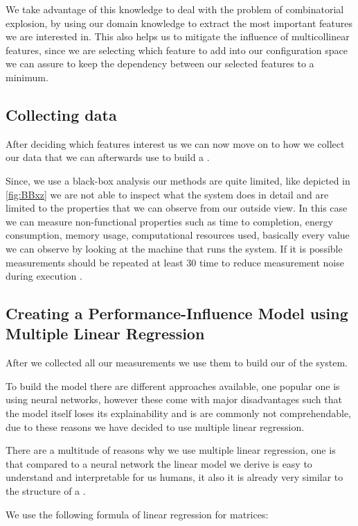 We take advantage of this knowledge to deal with the problem of combinatorial explosion, by using our domain knowledge to extract the most important
features we are interested in. This also helps us to mitigate the influence of multicollinear features, since we are selecting which feature to add
into our configuration space we can assure to keep the dependency between our selected features to a minimum.

\subsection{Collecting data}
After deciding which features interest us we can now move on to how we collect our data that we can afterwards use to build a \perfInfluenceModel.

Since, we use a black-box analysis our methods are quite limited, like depicted in \ref{fig:BBxz} we are not able to inspect what the system does 
in detail and are limited to the properties that we can observe from our outside view. In this case we can measure non-functional properties
such as time to completion, energy consumption, memory usage, computational resources used, basically every value we can observe by looking at the
machine that runs the system. If it is possible measurements should be repeated at least 30 time to reduce measurement noise during execution 
\cite{SampleSize}.


\subsection{Creating a Performance-Influence Model using Multiple Linear Regression}
After we collected all our measurements we use them to build our \perfInfluenceModel of the system. 

To build the model there are different
approaches available, one popular one is using neural networks, however these come with major disadvantages such that the model itself 
loses its explainability and is are commonly not comprehendable, due to these reasons we have decided to use multiple linear regression.

There are a multitude of reasons why we use multiple linear regression, one is that compared to a neural network the linear model we 
derive is easy to understand and interpretable for us humans, it also it is already very similar to the structure of a \perfInfluenceModel.

We use the following formula of linear regression for matrices\cite{Linear-Regression-Performance}:

